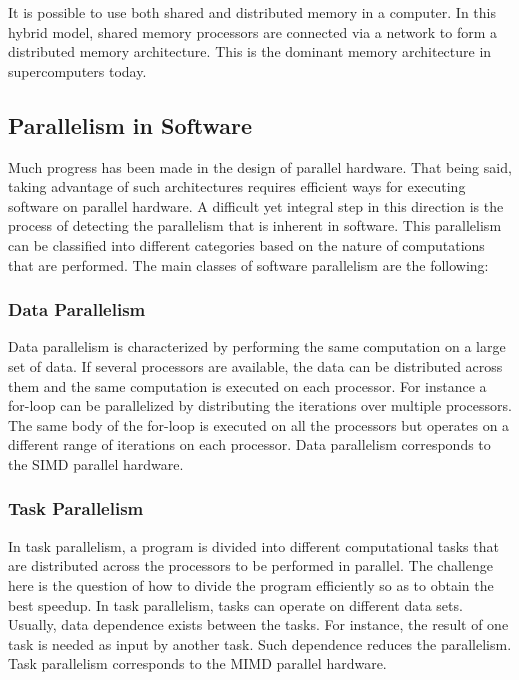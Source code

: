 It is possible to use both shared and distributed memory in a computer. In this hybrid model, shared memory processors are connected via a network to form a distributed memory architecture. This is the dominant memory architecture in supercomputers today.

\subsection{Parallelism in Software}

Much progress has been made in the design of parallel hardware. That being said, taking advantage of such architectures requires efficient ways for executing software on parallel hardware. A difficult yet integral step in this direction is the process of detecting the parallelism that is inherent in software. This parallelism can be classified into different categories based on the nature of computations that are performed. The main classes of software parallelism are the following:    

\subsubsection{Data Parallelism}
Data parallelism is characterized by performing the same computation on a large set of data. If several processors are available, the data can be distributed across them and the same computation is executed on each processor. For instance a for-loop can be parallelized by distributing the iterations over multiple processors. The same body of the for-loop is executed on all the processors but operates on a different range of iterations on each processor. Data parallelism corresponds to the SIMD parallel hardware.

\subsubsection{Task Parallelism}
In task parallelism, a program is divided into different computational tasks that are distributed across the processors to be performed in parallel. The challenge here is the question of how to divide the program efficiently so as to obtain the best speedup. In task parallelism, tasks can operate on different data sets. Usually, data dependence exists between the tasks. For instance, the result of one task is needed as input by another task. Such dependence reduces the parallelism. Task parallelism corresponds to the MIMD parallel hardware.

